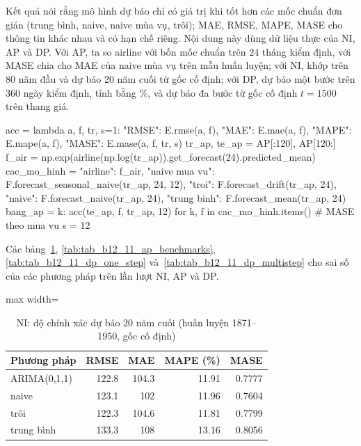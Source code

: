  Kết quả  nói rằng mô hình dự báo chỉ có giá trị khi tốt hơn các mốc chuẩn đơn giản (trung bình, naive, naive mùa vụ, trôi); MAE, RMSE, MAPE, MASE cho thông tin khác nhau và có hạn chế riêng.
 Nội dung này dùng dữ liệu thực của NI, AP và DP. Với AP, ta so airline với bốn mốc chuẩn trên $24$ tháng kiểm định, với MASE chia cho MAE của naive mùa vụ trên mẫu huấn luyện; với NI, khớp trên 80 năm đầu và dự báo 20 năm cuối từ gốc cố định; với DP, dự báo một bước trên $360$ ngày kiểm định, tính bằng \%, và dự báo đa bước từ gốc cố định $t=1500$ trên thang giá.
\begin{codeblock}
acc = lambda a, f, tr, s=1: {"RMSE": E.rmse(a, f), "MAE": E.mae(a, f),
                              "MAPE": E.mape(a, f), "MASE": E.mase(a, f, tr, s)}
tr_ap, te_ap = AP[:120], AP[120:]
f_air = np.exp(airline(np.log(tr_ap)).get_forecast(24).predicted_mean)
cac_mo_hinh = {"airline": f_air, "naive mua vu": F.forecast_seasonal_naive(tr_ap, 24, 12),
               "troi": F.forecast_drift(tr_ap, 24), "naive": F.forecast_naive(tr_ap, 24),
               "trung binh": F.forecast_mean(tr_ap, 24)}
bang_ap = {k: acc(te_ap, f, tr_ap, 12) for k, f in cac_mo_hinh.items()}   # MASE theo mua vu s = 12
\end{codeblock}
 Các bảng~\ref{tab:tab_b12_11_ni_benchmarks}, \ref{tab:tab_b12_11_ap_benchmarks}, \ref{tab:tab_b12_11_dp_one_step} và~\ref{tab:tab_b12_11_dp_multistep} cho sai số của các phương pháp trên lần lượt NI, AP và DP.
\begin{table}[H]
\centering\footnotesize
\caption{NI: độ chính xác dự báo 20 năm cuối (huấn luyện 1871--1950, gốc cố định)}\label{tab:tab_b12_11_ni_benchmarks}
\begin{adjustbox}{max width=\linewidth}
\begin{tabular}{|l|r|r|r|r|}
\toprule
Phương pháp & RMSE & MAE & MAPE (\%) & MASE \\
\midrule
ARIMA(0,1,1) & 122.8 & 104.3 & 11.91 & 0.7777 \\
naive & 123.1 & 102 & 11.96 & 0.7604 \\
trôi & 122.3 & 104.6 & 11.81 & 0.7799 \\
trung bình & 133.3 & 108 & 13.16 & 0.8056 \\
\bottomrule
\end{tabular}
\end{adjustbox}
\end{table}
